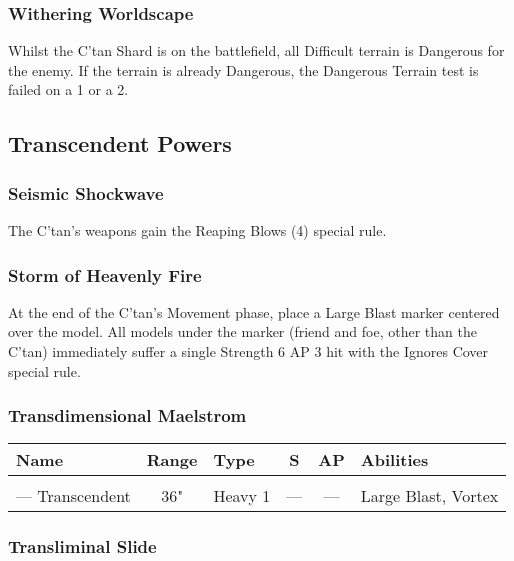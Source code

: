 \subsubsection{Withering Worldscape} \label{Withering Worldscape}

Whilst the C'tan Shard is on the battlefield, all Difficult terrain is Dangerous for the enemy. If the terrain is already Dangerous, the Dangerous Terrain test is failed on a 1 or a 2.


\subsection{Transcendent Powers}

\subsubsection{Seismic Shockwave} \label{Seismic Shockwave}

The C'tan's weapons gain the Reaping Blows (4) special rule.

\subsubsection{Storm of Heavenly Fire} \label{Storm of Heavenly Fire}

At the end of the C'tan's Movement phase, place a Large Blast marker centered over the model. All models under the marker (friend and foe, other than the C'tan) immediately suffer a single Strength 6 AP 3 hit with the Ignores Cover special rule.

\subsubsection{Transdimensional Maelstrom} \label{Transdimensional Maelstrom}

\noindent
\begin{NiceTabular}{L{115 pt} c C{40pt} *{2}{c} >{\raggedright\arraybackslash}p{240pt}}
	Name & Range & Type & S & AP & Abilities \\
	\hline
	 &  &  &  &  & \\
	— Transcendent & 36" & Heavy 1 & — & — & Large Blast, Vortex \\
\end{NiceTabular}

\subsubsection{Transliminal Slide} \label{Transliminal Slide}

